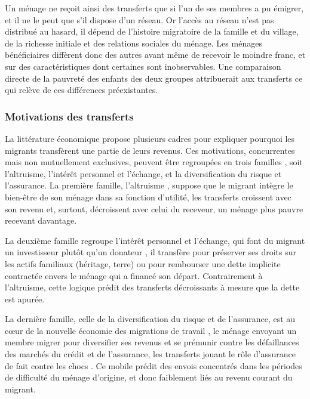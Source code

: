 Un ménage ne reçoit ainsi des
transferts que si l'un de ses membres a pu émigrer, et il ne le peut que s'il
dispose d'un réseau. Or l'accès au réseau n'est pas distribué au hasard, il
dépend de l'histoire migratoire de la famille et du village, de la richesse
initiale et des relations sociales du ménage. Les ménages bénéficiaires
diffèrent donc des autres avant même de recevoir le moindre franc, et sur des
caractéristiques dont certaines sont inobservables. Une comparaison directe de la
pauvreté des enfants des deux groupes attribuerait aux transferts ce qui
relève de ces différences préexistantes.

\subsubsection{Motivations des transferts}

La littérature économique propose plusieurs
cadres pour expliquer pourquoi les migrants transfèrent une partie de leurs
revenus. Ces motivations, concurrentes mais non mutuellement exclusives,
peuvent être regroupées en trois familles \parencite{rapport2006, azam2006},
soit l'altruisme, l'intérêt personnel et l'échange, et la diversification du risque et
l'assurance. La première famille, l'altruisme \parencite{lucas1985}, suppose que le migrant
intègre le bien-être de son ménage dans sa fonction d'utilité, les transferts
croissent avec son revenu et, surtout, décroissent avec celui du receveur, un
ménage plus pauvre recevant davantage.

La deuxième famille regroupe l'intérêt personnel et l'échange, qui font du
migrant un investisseur plutôt qu'un donateur \parencite{rapport2006}, il
transfère pour préserver ses droits sur les actifs familiaux (héritage, terre)
ou pour rembourser une dette implicite contractée envers le ménage qui a financé
son départ. Contrairement à l'altruisme, cette logique prédit des transferts
décroissants à mesure que la dette est apurée.

La dernière famille, celle de la diversification du risque et de l'assurance,
est au cœur de la nouvelle économie des migrations de travail
\parencite{stark1985}, le ménage envoyant un membre migrer pour diversifier ses
revenus et se prémunir contre les défaillances des marchés du crédit et de
l'assurance, les transferts jouant le rôle d'assurance de fait contre les chocs
\parencite{gubert2002}. Ce mobile prédit des envois concentrés dans les
périodes de difficulté du ménage d'origine, et donc faiblement liés au revenu
courant du migrant.


